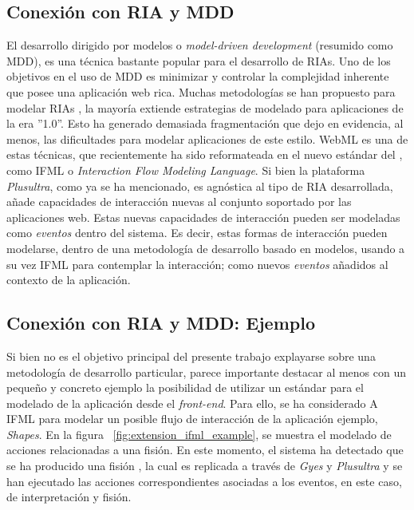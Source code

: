 \subsection{Conexión con RIA y MDD} \label{sec:extension_ria_mdd_conexion}
El desarrollo dirigido por modelos o \emph{model-driven development} (resumido como MDD), es una técnica bastante popular para el desarrollo de RIAs. Uno de los objetivos en el uso de MDD es minimizar y controlar la complejidad inherente que posee una aplicación web rica. 
Muchas metodologías se han propuesto para modelar RIAs \citep{wright2008requirements} \citep{preciado2005necessity}, la mayoría extiende estrategias de modelado para aplicaciones de la era ''1.0''. Esto ha generado demasiada fragmentación que dejo en evidencia, al menos, las dificultades para modelar aplicaciones de este estilo. WebML\citep{omg:webml} es una de estas técnicas, que recientemente ha sido reformateada en el nuevo estándar del \citet{omg:omg}, como IFML \citep{omg:ifml} o \emph{Interaction Flow Modeling Language}. 
Si bien la plataforma \emph{Plusultra}, como ya se ha mencionado, es agnóstica al tipo de RIA desarrollada, añade capacidades de interacción nuevas al conjunto soportado por las aplicaciones web. Estas nuevas capacidades de interacción pueden ser modeladas como \emph{eventos} dentro del sistema. 
Es decir, estas formas de interacción pueden modelarse, dentro de una metodología de desarrollo basado en modelos, usando a su vez IFML para contemplar la interacción; como nuevos \emph{eventos} añadidos al contexto de la aplicación.


\subsection{Conexión con RIA y MDD: Ejemplo}
Si bien no es el objetivo principal del presente trabajo explayarse sobre una metodología de desarrollo particular, parece importante destacar al menos con un pequeño y concreto ejemplo la posibilidad de utilizar un estándar para el modelado de la aplicación desde el \emph{front-end}. Para ello, se ha considerado A IFML para modelar un posible flujo de interacción de la aplicación ejemplo, \emph{Shapes}. En la figura ~\ref{fig:extension_ifml_example}, se muestra el modelado de acciones relacionadas a una fisión. En este momento, el sistema ha detectado que se ha producido una fisión , la cual es replicada a través de \emph{Gyes} y \emph{Plusultra} y se han ejecutado las acciones correspondientes asociadas a los eventos, en este caso, de interpretación y fisión.

